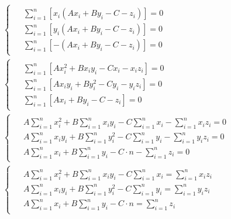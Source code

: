 \begin{align}
    \nonumber
    &\begin{cases}
         \begin{aligned}
             &\sum_{i=1}^{n} \left[ x_i \left( A x_i + B y_i - C - z_i \right) \right] = 0 \\
             &\sum_{i=1}^{n} \left[ y_i \left( A x_i + B y_i - C - z_i \right) \right] = 0 \\
             &\sum_{i=1}^{n} \left[ - \left( A x_i + B y_i - C - z_i \right) \right] = 0
         \end{aligned}
    \end{cases} \\ \nonumber
    &\begin{cases}
         \begin{aligned}
             &\sum_{i=1}^{n} \left[ A x_i^2 + B x_i y_i - C x_i - x_i z_i \right] = 0 \\
             &\sum_{i=1}^{n} \left[ A x_i y_i + B y_i^2 - C y_i - y_i z_i \right] = 0 \\
             &\sum_{i=1}^{n} \left[ A x_i + B y_i - C - z_i \right] = 0
         \end{aligned}
    \end{cases} \\ \nonumber
    &\begin{cases}
         \begin{aligned}
             &A \sum_{i=1}^{n} x_i^2
             + B \sum_{i=1}^{n} x_i y_i
             - C \sum_{i=1}^{n} x_i
             - \sum_{i=1}^{n} x_i z_i = 0 \\
             &A \sum_{i=1}^{n} x_i y_i
             + B \sum_{i=1}^{n} y_i^2
             - C \sum_{i=1}^{n} y_i
             - \sum_{i=1}^{n} y_i z_i = 0 \\
             &A \sum_{i=1}^{n} x_i
             + B \sum_{i=1}^{n} y_i
             - C \cdot n - \sum_{i=1}^{n} z_i = 0
         \end{aligned}
    \end{cases} \\
    &\begin{cases}
         \label{eq:Plane_MNK_Final_System}
         \begin{aligned}
             &A \sum_{i=1}^{n} x_i^2
             + B \sum_{i=1}^{n} x_i y_i
             - C \sum_{i=1}^{n} x_i
             = \sum_{i=1}^{n} x_i z_i \\
             &A \sum_{i=1}^{n} x_i y_i
             + B \sum_{i=1}^{n} y_i^2
             - C \sum_{i=1}^{n} y_i
             = \sum_{i=1}^{n} y_i z_i \\
             &A \sum_{i=1}^{n} x_i
             + B \sum_{i=1}^{n} y_i
             - C \cdot n = \sum_{i=1}^{n} z_i
         \end{aligned}
    \end{cases}
\end{align} \\


